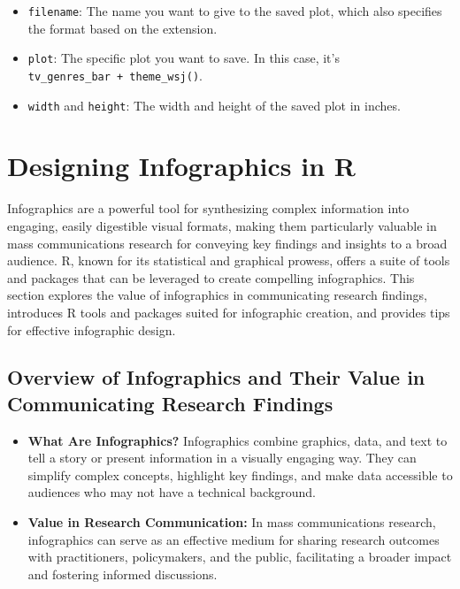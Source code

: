 \documentclass[
]{book}
\providecommand{\tightlist}{%
  \setlength{\itemsep}{0pt}\setlength{\parskip}{0pt}}
\begin{document}
\begin{itemize}
\tightlist
\item
  \texttt{filename}: The name you want to give to the saved plot, which also specifies the format based on the extension.
\item
  \texttt{plot}: The specific plot you want to save. In this case, it's \texttt{tv\_genres\_bar\ +\ theme\_wsj()}.
\item
  \texttt{width} and \texttt{height}: The width and height of the saved plot in inches.
\end{itemize}

\hypertarget{designing-infographics-in-r}{%
\section{Designing Infographics in R}\label{designing-infographics-in-r}}

Infographics are a powerful tool for synthesizing complex information into engaging, easily digestible visual formats, making them particularly valuable in mass communications research for conveying key findings and insights to a broad audience. R, known for its statistical and graphical prowess, offers a suite of tools and packages that can be leveraged to create compelling infographics. This section explores the value of infographics in communicating research findings, introduces R tools and packages suited for infographic creation, and provides tips for effective infographic design.

\hypertarget{overview-of-infographics-and-their-value-in-communicating-research-findings}{%
\subsection{Overview of Infographics and Their Value in Communicating Research Findings}\label{overview-of-infographics-and-their-value-in-communicating-research-findings}}

\begin{itemize}
\item
  \textbf{What Are Infographics?} Infographics combine graphics, data, and text to tell a story or present information in a visually engaging way. They can simplify complex concepts, highlight key findings, and make data accessible to audiences who may not have a technical background.
\item
  \textbf{Value in Research Communication:} In mass communications research, infographics can serve as an effective medium for sharing research outcomes with practitioners, policymakers, and the public, facilitating a broader impact and fostering informed discussions.
\end{itemize}
\end{document}
